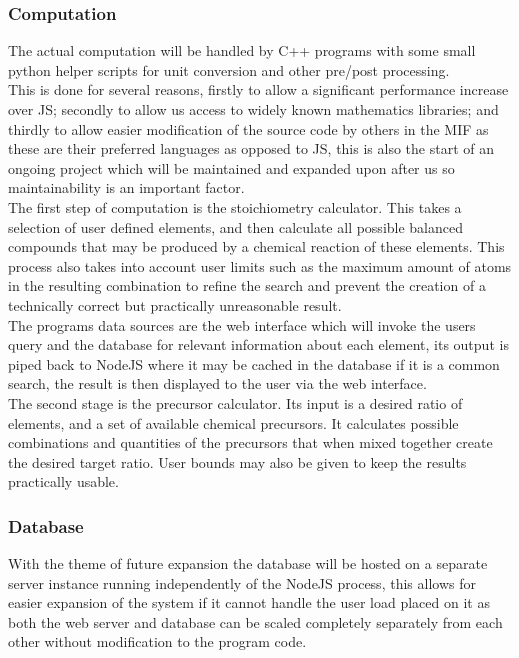 \subsubsection{Computation}
The actual computation will be handled by C++ programs with some small python helper scripts for unit conversion and other pre/post processing. \\

This is done for several reasons, firstly to allow a significant performance increase over JS; secondly to allow us access to widely known mathematics libraries; and thirdly to allow easier modification of the source code by others in the MIF as these are their preferred languages as opposed to JS, this is also the start of an ongoing project which will be maintained and expanded upon after us so maintainability is an important factor. \\

The first step of computation is the stoichiometry calculator. This takes a selection of user defined elements, and then calculate all possible balanced compounds that may be produced by a chemical reaction of these elements. This process also takes into account user limits such as the maximum amount of atoms in the resulting combination to refine the search and prevent the creation of a technically correct but practically unreasonable result. \\

The programs data sources are the web interface which will invoke the users query and the database for relevant information about each element, its output is piped back to NodeJS where it may be cached in the database if it is a common search, the result is then displayed to the user via the web interface. \\

The second stage is the precursor calculator. Its input is a desired ratio of elements, and a set of available chemical precursors. It calculates possible combinations and quantities of the precursors that when mixed together create the desired target ratio. User bounds may also be given to keep the results practically usable.


\subsubsection{Database}
With the theme of future expansion the database will be hosted on a separate server instance running independently of the NodeJS process, this allows for easier expansion of the system if it cannot handle the user load placed on it as both the web server and database can be scaled completely separately from each other without modification to the program code. \\ 

